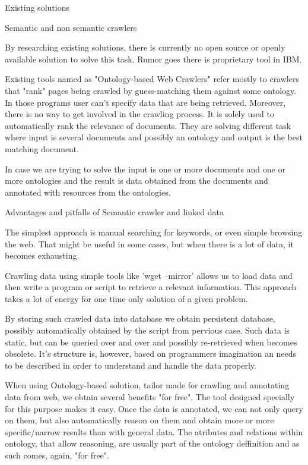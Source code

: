 
\chap Existing solutions


\sec Semantic and non semantic crawlers

By researching existing solutions, there is currently no open source or openly
available solution to solve this task. Rumor goes there is proprietary tool in IBM.

Existing tools named as "Ontology-based Web Crawlers" refer mostly to crawlers
that "rank" pages being crawled by guess-matching them against some ontology.
In those programs user can't specify data that are being retrieved. Moreover,
there is no way to get involved in the crawling process. It is solely used to
automatically rank the relevance of documents. They are solving different task
where input is several documents and possibly an ontology and output is the
best matching document. 

In case we are trying to solve the input is one or more documents and one or
more ontologies and the result is data obtained from the documents and
annotated with resources from the ontologies. 


\sec Advantages and pitfalls of Semantic crawler and linked data

The simplest approach is manual searching for keywords, or even simple browsing
the web. That might be useful in some cases, but when there is a lot of data,
it becomes exhausting. 

Crawling data using simple tools like 'wget --mirror' allows us to load data
and then write a program or script to retrieve a relevant information. This
approach takes a lot of energy for one time only solution of a given problem. 

By storing such crawled data into database we obtain persistent database,
possibly automatically obtained by the script from pervious case. Such data is
static, but can be queried over and over and possibly re-retrieved when becomes
obsolete. It's structure is, however, based on programmers imagination an
needs to be described in order to understand and handle the data properly. 

When using Ontology-based solution, tailor made for crawling and annotating
data from web, we obtain several benefits "for free". The tool designed
specially for this purpose makes it easy. Once the data is annotated, we can
not only query on them, but also automatically reason on them and obtain more
or more specific/narrow results than with general data. The atributes and
relations within ontology, that allow reasoning, are usually part of the
ontology deffinition and as such comes, again, "for free". 

